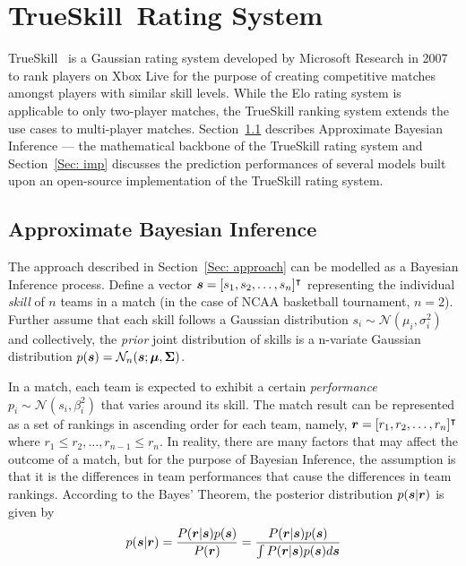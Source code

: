 \chapter{TrueSkill\texttrademark~Rating System}\label{Chap:3}
TrueSkill~\cite{TS07} is a Gaussian rating system developed by Microsoft Research in 2007 to rank players on Xbox Live for the purpose of creating competitive matches amongst players with similar skill levels. While the Elo rating system is applicable to only two-player matches, the TrueSkill ranking system extends the use cases to multi-player matches. Section~\ref{Sec: tmm} describes Approximate Bayesian Inference --- the mathematical backbone of the TrueSkill rating system and Section~\ref{Sec: imp} discusses the prediction performances of several models built upon an open-source implementation of the TrueSkill rating system. 

\section{Approximate Bayesian Inference}\label{Sec: tmm}

The approach described in Section~\ref{Sec: approach} can be modelled as a Bayesian Inference process. Define a vector $\bm{s}  = [s_{1}, s_{2}, \ldots, s_{n}]^{\intercal}$ representing the individual \emph{skill} of $n$ teams in a match (in the case of NCAA basketball tournament, $n = 2$). Further assume that each skill follows a Gaussian distribution $s_{i} \sim \mathcal{N}(\mu_{i}, \sigma_{i}^{2})$ and collectively, the \emph{prior} joint distribution of skills is a n-variate Gaussian distribution $p(\bm{s}) = \mathcal{N}_{n}(\bm{s}; \bm{\mu}, \bm{\Sigma})$.

In a match, each team is expected to exhibit a certain \emph{performance} $p_{i} \sim \mathcal{N}(s_{i}, \beta_{i}^{2})$ that varies around its skill. The match result can be represented as a set of rankings in ascending order for each team, namely, $\bm{r} = [r_{1}, r_{2}, \ldots, r_{n}]^{\intercal}$ where $r_{1} \leq r_{2}, \ldots, r_{n - 1} \leq r_{n}$. In reality, there are many factors that may affect the outcome of a match, but for the purpose of Bayesian Inference, the assumption is that it is the differences in team performances that cause the differences in team rankings. According to the Bayes' Theorem, the posterior distribution $p(\bm{s} | \bm{r})$ is given by
\begin{equation}\label{Eqn: bayes}
p(\bm{s} | \bm{r}) = \frac{P(\bm{r} | \bm{s})p(\bm{s})}{P(\bm{r})} = \frac{P(\bm{r} | \bm{s})p(\bm{s})}{\int P(\bm{r} | \bm{s})p(\bm{s})d\bm{s}}
\end{equation}

